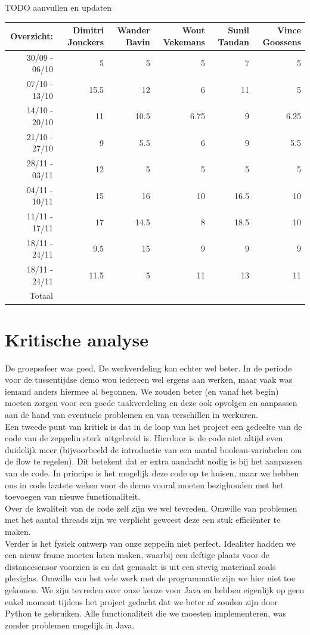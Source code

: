 \documentclass[eind]{penoverslag}
\begin{document}
TODO aanvullen en updaten

\begin{tabular}{r||r|r|r|r|r}
Overzicht: & Dimitri Jonckers & Wander Bavin & Wout Vekemans & Sunil Tandan & Vince Goossens \\
\hline \hline 
30/09 - 06/10 & 5 & 5 & 5 & 7 & 5 \\
07/10 - 13/10 & 15.5 & 12 & 6 & 11 & 5 \\
14/10 - 20/10 & 11 & 10.5 & 6.75 & 9 & 6.25 \\
21/10 - 27/10 & 9 & 5.5 & 6 & 9 & 5.5 \\
28/11 - 03/11 & 12 & 5 & 5 & 5 & 5 \\
04/11 - 10/11 & 15 & 16 & 10 & 16.5 & 10 \\
11/11 - 17/11 & 17 & 14.5 & 8 & 18.5 & 10 \\
18/11 - 24/11 & 9.5 & 15 & 9 & 9 & 9 \\
18/11 - 24/11 & 11.5 & 5 & 11 & 13 & 11 \\
\hline \hline
Totaal &  &  &  &  &  \\
\end{tabular}

\section{Kritische analyse}
De groepssfeer was goed. De werkverdeling kon echter wel beter. In de periode voor de tussentijdse demo wou iedereen wel ergens aan werken, maar vaak was iemand anders hiermee al begonnen. We zouden beter (en vanaf het begin) moeten zorgen voor een goede taakverdeling en deze ook opvolgen en aanpassen aan de hand van eventuele problemen en van verschillen in werkuren. \\
Een tweede punt van kritiek is dat in de loop van het project een gedeelte van de code van de zeppelin sterk uitgebreid is. Hierdoor is de code niet altijd even duidelijk meer (bijvoorbeeld de introductie van een aantal boolean-variabelen om de flow te regelen). Dit betekent dat er extra aandacht nodig is bij het aanpassen van de code. In principe is het mogelijk deze code op te kuisen, maar we hebben ons in code laatste weken voor de demo vooral moeten bezighouden met het toevoegen van nieuwe functionaliteit. \\
Over de kwaliteit van de code zelf zijn we wel tevreden. Omwille van problemen met het aantal threads zijn we verplicht geweest deze een stuk efficiënter te maken. \\
Verder is het fysiek ontwerp van onze zeppelin niet perfect. Idealiter hadden we een nieuw frame moeten laten maken, waarbij een deftige plaats voor de distancesensor voorzien is en dat gemaakt is uit een stevig materiaal zoals plexiglas. Omwille van het vele werk met de programmatie zijn we hier niet toe gekomen.
We zijn tevreden over onze keuze voor Java en hebben eigenlijk op geen enkel moment tijdens het project gedacht dat we beter af zouden zijn door Python te gebruiken. Alle functionaliteit die we moesten implementeren, was zonder problemen mogelijk in Java. \\
\end{document}
